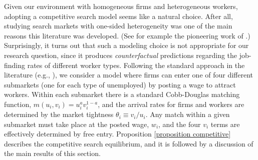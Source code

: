 \documentclass[12pt]{article} %
\theoremstyle{definition}
\begin{document}
Given our environment with homogeneous firms and heterogeneous workers, adopting a competitive search model seems like a natural choice. After all, studying search markets with one-sided heterogeneity was one of the main reasons this literature was developed. (See for example the pioneering work of  \citealt{montgomery1991equilibrium}.) Surprisingly, it turns out that such a modeling choice is not appropriate for our research question, since it produces \textit{counterfactual} predictions regarding the job-finding rates of different worker types. Following the standard approach in the literature (e.g., \citealt{rogerson2005search}), we consider a model where firms can enter one of four different submarkets (one for each type of unemployed) by posting a wage to attract workers. Within each submarket there is a standard Cobb-Douglas matching function, $m(u_i,v_i)=u_i^a v_i^{1-a}$, and the arrival rates for firms and workers are determined by the market tightness $\theta_i \equiv v_i/u_i$. Any match within a given submarket must take place at the posted wage, $w_i$, and the four $v_i$ terms are effectively determined by free entry.  
Proposition \ref{proposition competitive} describes the competitive search equilibrium, and it is followed by a discussion of the main results of this section.
\end{document}
